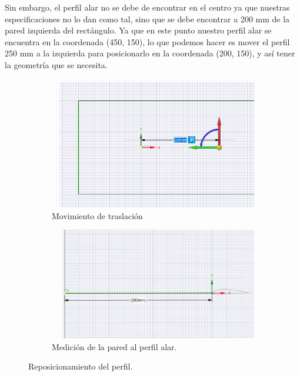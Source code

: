 \documentclass[12pt, letterpaper]{article}
\begin{document}
Sin embargo, el perfil alar no se debe de encontrar en el centro ya que nuestras especificaciones no lo dan como tal, sino que se debe encontrar a 200 mm de la pared izquierda del rectángulo. Ya que en este punto nuestro perfil alar se encuentra en la coordenada (450, 150), lo que podemos hacer es mover el perfil 250 mm a la izquierda para posicionarlo en la coordenada (200, 150), y así tener la geometría que se necesita.

\begin{figure}[H]
	\centering
	\begin{subfigure}[b]{0.49\linewidth}
		\includegraphics[width=\linewidth]{10.png}
		\caption{Movimiento de traslación}
	\end{subfigure}
	\begin{subfigure}[b]{0.49\linewidth}
		\includegraphics[width=\linewidth]{11.png}
		\caption{Medición de la pared al perfil alar.}
	\end{subfigure}
	\caption{Reposicionamiento del perfil.}
\end{figure}
\end{document}
